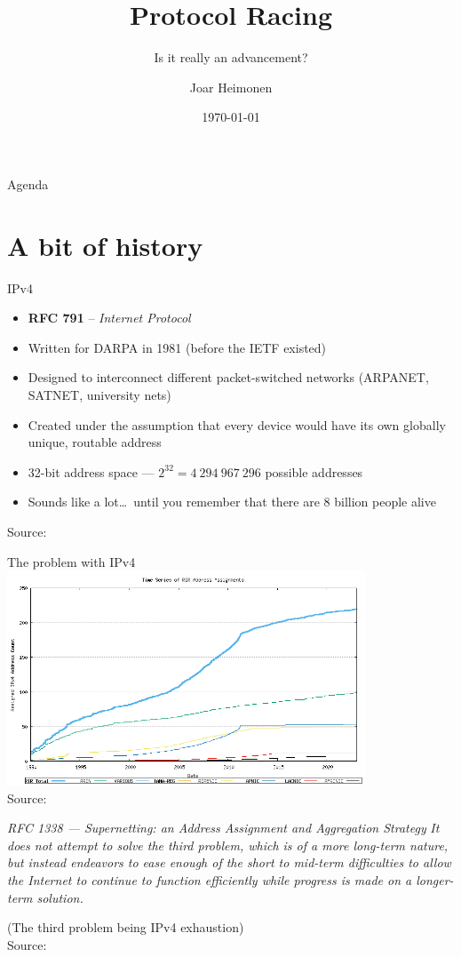 \documentclass[aspectratio=169]{beamer}
\title[Protocol Racing]{Protocol Racing}
\subtitle{Is it really an advancement?}
\author[Joar Heimonen]{Joar Heimonen}
\date{\today}
\begin{document}
\uiofrontpage[dept={}, image={image.png}, inverted]

\begin{frame}{Agenda}
  \tableofcontents
\end{frame}

\section{A bit of history}
\begin{frame}{IPv4}
  \begin{itemize}
    \item \textbf{RFC 791} – \emph{Internet Protocol}
    \item Written for DARPA in 1981 (before the IETF existed)
    \item Designed to interconnect different packet-switched networks (ARPANET, SATNET, university nets)
    \item Created under the assumption that every device would have its own globally unique, routable address
    \item 32-bit address space — \(2^{32} = 4\ 294\ 967\ 296\) possible addresses
    \item Sounds like a lot\ldots\ until you remember that there are 8 billion people alive
  \end{itemize}
  \centering
  {\tiny Source: \parencite{InternetProtocol1981a}}
\end{frame}

\begin{frame}{The problem with IPv4}
  \centering
  \includegraphics[width=0.8\textwidth]{fig09.png}
  \\
  {\tiny Source: \parencite{IPv4AddressReport}}
\end{frame}

\begin{frame}
\small
\begin{block}{\textit{RFC 1338 — Supernetting: an Address Assignment and Aggregation Strategy}}
\vspace{0.5em}
\textit{It does not attempt to solve the third problem,
which is of a more long-term nature, but instead endeavors to ease
enough of the short to mid-term difficulties to allow the Internet to
continue to function efficiently while progress is made on a longer-
term solution.}
\end{block}
(The third problem being IPv4 exhaustion)
\centering
\\
{\tiny Source: \parencite{fullerSupernettingAddressAssignment1992}}
\end{frame}
\end{document}
